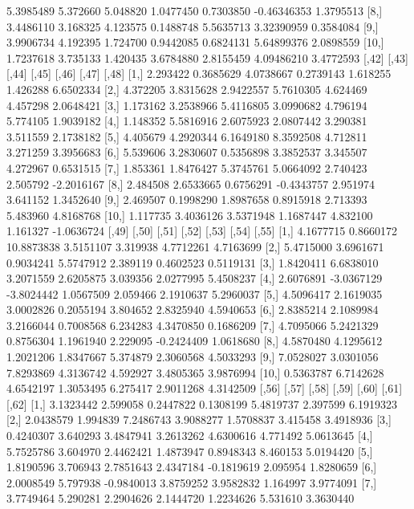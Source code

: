 \documentclass[12pt]{article}
\begin{document}
\begin{Schunk}
\begin{Soutput}
 [7,] 5.3985489  5.372660 5.048820  1.0477450  0.7303850 -0.46346353  1.3795513
 [8,] 3.4486110  3.168325 4.123575  0.1488748  5.5635713  3.32390959  0.3584084
 [9,] 3.9906734  4.192395 1.724700  0.9442085  0.6824131  5.64899376  2.0898559
[10,] 1.7237618  3.735133 1.420435  3.6784880  2.8155459  4.09486210  3.4772593
         [,42]     [,43]     [,44]      [,45]    [,46]    [,47]      [,48]
 [1,] 2.293422 0.3685629 4.0738667  0.2739143 1.618255 1.426288  6.6502334
 [2,] 4.372205 3.8315628 2.9422557  5.7610305 4.624469 4.457298  2.0648421
 [3,] 1.173162 3.2538966 5.4116805  3.0990682 4.796194 5.774105  1.9039182
 [4,] 1.148352 5.5816916 2.6075923  2.0807442 3.290381 3.511559  2.1738182
 [5,] 4.405679 4.2920344 6.1649180  8.3592508 4.712811 3.271259  3.3956683
 [6,] 5.539606 3.2830607 0.5356898  3.3852537 3.345507 4.272967  0.6531515
 [7,] 1.853361 1.8476427 5.3745761  5.0664092 2.740423 2.505792 -2.2016167
 [8,] 2.484508 2.6533665 0.6756291 -0.4343757 2.951974 3.641152  1.3452640
 [9,] 2.469507 0.1998290 1.8987658  0.8915918 2.713393 5.483960  4.8168768
[10,] 1.117735 3.4036126 3.5371948  1.1687447 4.832100 1.161327 -1.0636724
          [,49]      [,50]      [,51]     [,52]    [,53]      [,54]     [,55]
 [1,] 4.1677715  0.8660172 10.8873838 3.5151107 3.319938  4.7712261 4.7163699
 [2,] 5.4715000  3.6961671  0.9034241 5.5747912 2.389119  0.4602523 0.5119131
 [3,] 1.8420411  6.6838010  3.2071559 2.6205875 3.039356  2.0277995 5.4508237
 [4,] 2.6076891 -3.0367129 -3.8024442 1.0567509 2.059466  2.1910637 5.2960037
 [5,] 4.5096417  2.1619035  3.0002826 0.2055194 3.804652  2.8325940 4.5940653
 [6,] 2.8385214  2.1089984  3.2166044 0.7008568 6.234283  4.3470850 0.1686209
 [7,] 4.7095066  5.2421329  0.8756304 1.1961940 2.229095 -0.2424409 1.0618680
 [8,] 4.5870480  4.1295612  1.2021206 1.8347667 5.374879  2.3060568 4.5033293
 [9,] 7.0528027  3.0301056  7.8293869 4.3136742 4.592927  3.4805365 3.9876994
[10,] 0.5363787  6.7142628  4.6542197 1.3053495 6.275417  2.9011268 4.3142509
           [,56]    [,57]      [,58]     [,59]      [,60]     [,61]     [,62]
 [1,]  3.1323442 2.599058  0.2447822 0.1308199  5.4819737  2.397599 6.1919323
 [2,]  2.0438579 1.994839  7.2486743 3.9088277  1.5708837  3.415458 3.4918936
 [3,]  0.4240307 3.640293  3.4847941 3.2613262  4.6300616  4.771492 5.0613645
 [4,]  5.7525786 3.604970  2.4462421 1.4873947  0.8948343  8.460153 5.0194420
 [5,]  1.8190596 3.706943  2.7851643 2.4347184 -0.1819619  2.095954 1.8280659
 [6,]  2.0008549 5.797938 -0.9840013 3.8759252  3.9582832  1.164997 3.9774091
 [7,]  3.7749464 5.290281  2.2904626 2.1444720  1.2234626  5.531610 3.3630440

\end{Soutput}
\end{Schunk}
\end{document}
